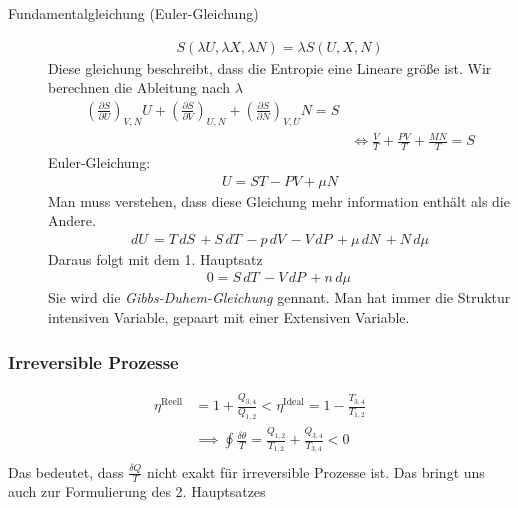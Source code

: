 \documentclass[11pt]{article}
\theoremstyle{plain}
\theoremstyle{mytheoremstyle}
\newcommand{\pd}[2]{\frac{\partial #1 }{\partial #2}}
\renewcommand{\d}[1]{\,d#1\,}
\begin{document}
\begin{description}
  \item[Fundamentalgleichung (Euler-Gleichung)] 
    \begin{align*}
      S(\lambda U, \lambda X, \lambda N) = \lambda S (U, X, N)
    \end{align*}
    Diese gleichung beschreibt, dass die Entropie eine Lineare größe ist.
    Wir berechnen die Ableitung nach $\lambda$
    \begin{align*}
      \left( \pd{S}{U} \right)_{V, N} U + \left( \pd{S}{V} \right)_{U,N}
      + \left( \pd{S}{N} \right)_{V,U} N = S \\
      & \iff 
      \frac{V}{T} +\frac{PV}{T} +\frac{MN}{T} = S
    \end{align*}
    Euler-Gleichung:
    \begin{align*}
      U = ST - PV + \mu N
    \end{align*}
    Man muss verstehen, dass diese Gleichung mehr information enthält als
    die Andere.
    \begin{align*}
      \d{U} = T \d{S} + S \d{T} - p \d{V} - V \d{P} + \mu \d{N} + N \d{\mu}
    \end{align*}
    Daraus folgt mit dem 1. Hauptsatz
    \begin{align*}
      0 = S \d{T} - V \d{P} + n \d{\mu}
    \end{align*}
    Sie wird die \emph{Gibbs-Duhem-Gleichung} gennant.
    Man hat immer die Struktur intensiven Variable, gepaart mit einer Extensiven
    Variable.
\end{description}
\subsubsection*{Irreversible Prozesse}
%
\begin{align*}
  \eta^{\text{Reell}} &= 1 +\frac{Q_{3,4}}{Q_{1,2}} < \eta^{\text{Ideal}} = 1-\frac{T_{3,4}}{T_{1,2}} \\
         & \implies \oint 
\frac{\delta \theta}{T} =\frac{Q_{1,2}}{T_{1,2}} +\frac{Q_{3,4}}{T_{3,4}} < 0  \\
\end{align*}
%
Das bedeutet, dass $\frac{\delta Q}{T}$ nicht exakt für irreversible Prozesse ist.
Das bringt uns auch zur Formulierung des 2. Hauptsatzes
\end{document}
